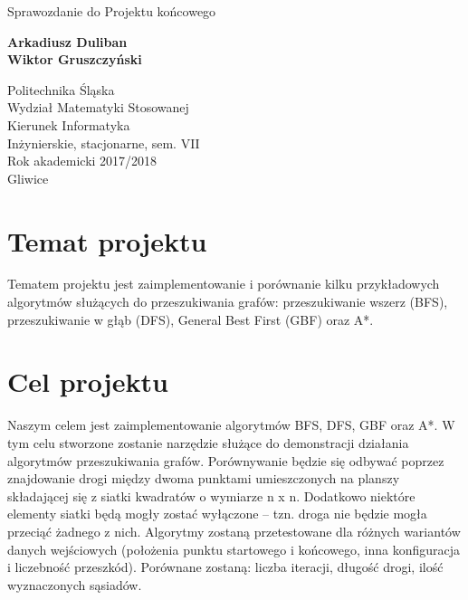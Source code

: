 \documentclass{article}
\begin{document}
\begin{titlepage}
    \begin{center}
        \vspace*{1cm}
        
        \Huge{Sprawozdanie do Projektu końcowego}
        
        
        \vspace{1.5cm}
        
        \large \textbf{Arkadiusz Duliban} \\
        \large \textbf{Wiktor Gruszczyński}
        
        \vfill
        
        
        \vspace{0.8cm}
        

        
        Politechnika Śląska\\
        Wydział Matematyki Stosowanej\\
        Kierunek Informatyka\\
        Inżynierskie, stacjonarne, sem. VII\\
        Rok akademicki 2017/2018
\\
        Gliwice
        
    \end{center}
\end{titlepage}

\newpage

\tableofcontents

\newpage

\section{Temat projektu}
Tematem projektu jest zaimplementowanie i porównanie kilku przykładowych algorytmów służących do przeszukiwania grafów: przeszukiwanie wszerz (BFS), przeszukiwanie w głąb (DFS), General Best First (GBF) oraz A*. 
\section{Cel projektu}
Naszym celem jest zaimplementowanie algorytmów BFS, DFS, GBF oraz A*. W tym celu stworzone zostanie narzędzie służące do demonstracji działania algorytmów przeszukiwania grafów. Porównywanie będzie się odbywać poprzez znajdowanie drogi między dwoma punktami umieszczonych na planszy składającej się z siatki kwadratów o wymiarze n x n. Dodatkowo niektóre elementy siatki będą mogły zostać wyłączone – tzn. droga nie będzie mogła przeciąć żadnego z nich. 
Algorytmy zostaną przetestowane dla różnych wariantów danych wejściowych (położenia punktu startowego i końcowego,  inna konfiguracja i liczebność przeszkód). Porównane zostaną: liczba iteracji, długość drogi, ilość wyznaczonych sąsiadów.
\end{document}
